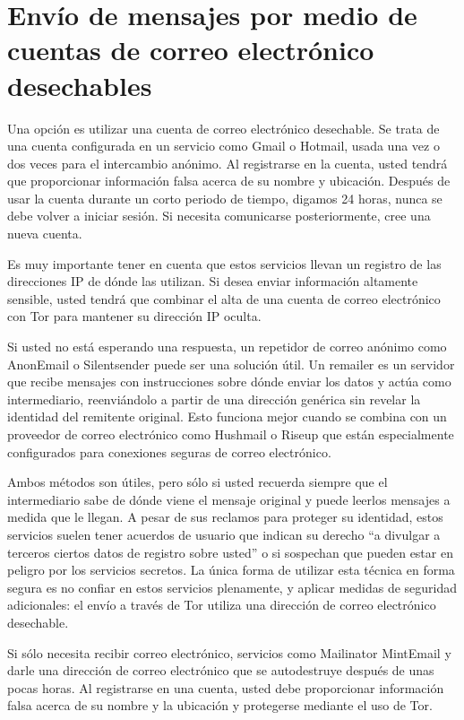 \documentclass[10pt,a5paper,twoside,,]{book}
\begin{document}
\section{Envío de mensajes por medio de cuentas de correo electrónico
desechables}\label{envuxedo-de-mensajes-por-medio-de-cuentas-de-correo-electruxf3nico-desechables}

Una opción es utilizar una cuenta de correo electrónico desechable. Se
trata de una cuenta configurada en un servicio como Gmail o Hotmail,
usada una vez o dos veces para el intercambio anónimo. Al registrarse en
la cuenta, usted tendrá que proporcionar información falsa acerca de su
nombre y ubicación. Después de usar la cuenta durante un corto periodo
de tiempo, digamos 24 horas, nunca se debe volver a iniciar sesión. Si
necesita comunicarse posteriormente, cree una nueva cuenta.

Es muy importante tener en cuenta que estos servicios llevan un registro
de las direcciones IP de dónde las utilizan. Si desea enviar información
altamente sensible, usted tendrá que combinar el alta de una cuenta de
correo electrónico con Tor para mantener su dirección IP oculta.

Si usted no está esperando una respuesta, un repetidor de correo anónimo
como AnonEmail o Silentsender puede ser una solución útil. Un remailer
es un servidor que recibe mensajes con instrucciones sobre dónde enviar
los datos y actúa como intermediario, reenviándolo a partir de una
dirección genérica sin revelar la identidad del remitente original. Esto
funciona mejor cuando se combina con un proveedor de correo electrónico
como Hushmail o Riseup que están especialmente configurados para
conexiones seguras de correo electrónico.

Ambos métodos son útiles, pero sólo si usted recuerda siempre que el
intermediario sabe de dónde viene el mensaje original y puede leerlos
mensajes a medida que le llegan. A pesar de sus reclamos para proteger
su identidad, estos servicios suelen tener acuerdos de usuario que
indican su derecho ``a divulgar a terceros ciertos datos de registro
sobre usted'' o si sospechan que pueden estar en peligro por los
servicios secretos. La única forma de utilizar esta técnica en forma
segura es no confiar en estos servicios plenamente, y aplicar medidas de
seguridad adicionales: el envío a través de Tor utiliza una dirección de
correo electrónico desechable.

Si sólo necesita recibir correo electrónico, servicios como Mailinator
MintEmail y darle una dirección de correo electrónico que se
autodestruye después de unas pocas horas. Al registrarse en una cuenta,
usted debe proporcionar información falsa acerca de su nombre y la
ubicación y protegerse mediante el uso de Tor.
\end{document}
